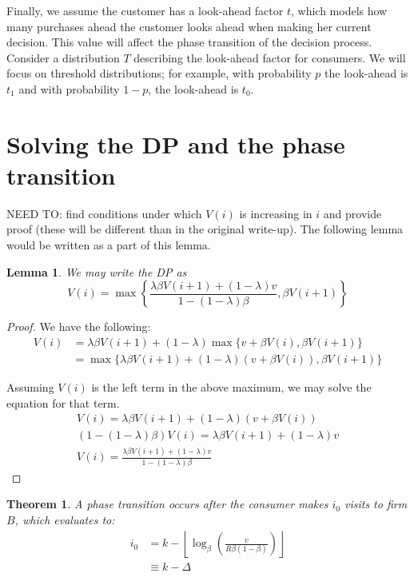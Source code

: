 \documentclass{article}
\newtheorem{theorem}{Theorem}[section]
\newtheorem{lemma}{Lemma}[section]
\begin{document}
Finally, we assume the customer has a look-ahead factor $t$, which models how many purchases ahead the customer looks ahead when making her current decision. This value will affect the phase transition of the decision process. Consider a distribution $T$ describing the look-ahead factor for consumers. We will focus on threshold distributions; for example, with probability $p$ the look-ahead is $t_1$ and with probability $1-p$, the look-ahead is $t_0$.

\section{Solving the DP and the phase transition}

NEED TO: find conditions under which $V(i)$ is increasing in $i$ and provide proof (these will be different than in the original write-up). The following lemma would be written as a part of this lemma. \\

\begin{lemma} We may write the DP as
\begin{equation*}
V(i) = \max\left\{ \frac{\lambda \beta V(i+1)+(1-\lambda)v}{1-(1-\lambda)\beta}, \beta V(i+1) \right\}
\end{equation*}
\end{lemma}

\begin{proof}
We have the following:
\begin{align*}
V(i) &= \lambda \beta V(i+1) + (1-\lambda)\max\{v +\beta V(i), \beta V(i+1) \} \\
&= \max\{\lambda \beta V(i+1) + (1-\lambda)(v+\beta V(i)), \beta V(i+1) \}
\end{align*}

Assuming $V(i)$ is the left term in the above maximum, we may solve the equation for that term.
\begin{gather*}
V(i) = \lambda \beta V(i+1) + (1-\lambda)(v+\beta V(i)) \\
(1-(1-\lambda)\beta) V(i) = \lambda \beta V(i+1) + (1-\lambda)v \\
V(i) = \frac{\lambda \beta V(i+1) + (1-\lambda)v}{1-(1-\lambda)\beta}
\end{gather*}\end{proof}

\begin{theorem} A phase transition occurs after the consumer makes $i_0$ visits to firm $B$, which evaluates to:
\begin{align*}
i_0 &= k - \left\lfloor{\log_{\beta}\left(\frac{v}{R\beta(1-\beta)} \right)}\right\rfloor \\
&\equiv k-\Delta
\end{align*}
\end{theorem}
\end{document}
